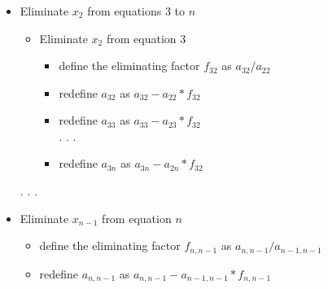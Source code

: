 \documentclass[fleqn]{beamer} %
\newcommand{\sectionIVsubsectionIItitle}{}
\begin{document}
			\begin{frame}
				\frametitle{\sectionIVsubsectionIItitle}
				\bigskip

				\begin{itemize}				
				\item   Eliminate $x_2$ from equations $3$ to $n$ \\
				\begin{itemize}
						\item Eliminate $x_2$ from equation $3$
					\begin{itemize}
						\item define the eliminating factor $f_{32}$ as $a_{32}/a_{22}$
						\item redefine $a_{32}$ as $a_{32}-a_{22}*f_{32}$
						\item redefine $a_{33}$ as $a_{33}-a_{23}*f_{32}$\\
						. . .
						\item redefine $a_{3n}$ as $a_{3n}-a_{2n}*f_{32}$ \\
						
					\end{itemize}
				
				\end{itemize}	
				. . . 
				\item   Eliminate $x_{n-1}$ from equation $n$ 

					\begin{itemize}
						\item define the eliminating factor $f_{n,n-1}$ as $a_{n,n-1}/a_{n-1,n-1}$
						\item redefine $a_{n,n-1}$ as $a_{n,n-1}-a_{n-1,n-1}*f_{n,n-1}$
						
					\end{itemize}
		
				\end{itemize}    

				\btVFill
			\end{frame}	
\end{document}
